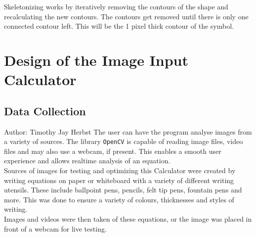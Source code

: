 \documentclass[12pt]{article}
\begin{document}
	Skeletonizing works by iteratively removing the contours of the shape and recalculating the new contours. The contours get removed until there is only one connected contour left. This will be the 1 pixel thick contour of the symbol.
	
	\section{Design of the Image Input Calculator}
	
	\subsection{Data Collection}
	\small{Author: Timothy Jay Herbst} \newline \newline
	The user can have the program analyse images from a variety of sources.
	The library \texttt{OpenCV} is capable of reading image files, video files and may also use a webcam, if present.
	This enables a smooth user experience and allows realtime analysis of an equation.\\
	Sources of images for testing and optimizing this Calculator were created by writing equations on paper or whiteboard with a variety of different writing utensils.
	These include ballpoint pens, pencils, felt tip pens, fountain pens and more.
	This was done to ensure a variety of colours, thicknesses and styles of writing.\\
	Images and videos were then taken of these equations, or the image was placed in front of a webcam for live testing.
	
	
\end{document}
